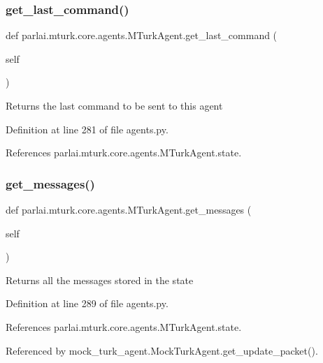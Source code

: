 \subsubsection{\texorpdfstring{get\+\_\+last\+\_\+command()}{get\_last\_command()}}
{\footnotesize\ttfamily def parlai.\+mturk.\+core.\+agents.\+M\+Turk\+Agent.\+get\+\_\+last\+\_\+command (\begin{DoxyParamCaption}\item[{}]{self }\end{DoxyParamCaption})}

\begin{DoxyVerb}Returns the last command to be sent to this agent\end{DoxyVerb}
 

Definition at line 281 of file agents.\+py.



References parlai.\+mturk.\+core.\+agents.\+M\+Turk\+Agent.\+state.

\mbox{\label{classparlai_1_1mturk_1_1core_1_1agents_1_1MTurkAgent_ae941b277cbfee3e76b543b780ca804f9}} 
\subsubsection{\texorpdfstring{get\+\_\+messages()}{get\_messages()}}
{\footnotesize\ttfamily def parlai.\+mturk.\+core.\+agents.\+M\+Turk\+Agent.\+get\+\_\+messages (\begin{DoxyParamCaption}\item[{}]{self }\end{DoxyParamCaption})}

\begin{DoxyVerb}Returns all the messages stored in the state\end{DoxyVerb}
 

Definition at line 289 of file agents.\+py.



References parlai.\+mturk.\+core.\+agents.\+M\+Turk\+Agent.\+state.



Referenced by mock\+\_\+turk\+\_\+agent.\+Mock\+Turk\+Agent.\+get\+\_\+update\+\_\+packet().

